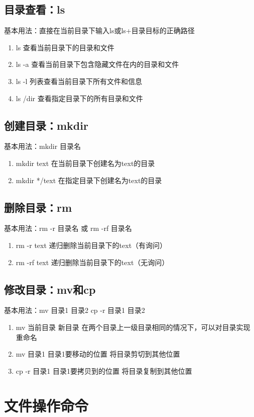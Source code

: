 \documentclass{article}
\begin{document}
\subsection{目录查看：ls}
基本用法：直接在当前目录下输入ls或ls+目录目标的正确路径
\begin{enumerate}
    \item ls 查看当前目录下的目录和文件
    \item ls -a 查看当前目录下包含隐藏文件在内的目录和文件
    \item ls -l 列表查看当前目录下所有文件和信息
    \item ls /dir 查看指定目录下的所有目录和文件
\end{enumerate}

\subsection{创建目录：mkdir}
基本用法：mkdir 目录名
\begin{enumerate}
    \item mkdir text 在当前目录下创建名为text的目录
    \item mkdir */text 在指定目录下创建名为text的目录
\end{enumerate}

\subsection{删除目录：rm}
基本用法：rm -r 目录名 或 rm -rf 目录名
\begin{enumerate}
    \item rm -r text 递归删除当前目录下的text（有询问）
    \item rm -rf text 递归删除当前目录下的text（无询问）
\end{enumerate}

\subsection{修改目录：mv和cp}
基本用法：mv 目录1 目录2 cp -r 目录1 目录2
\begin{enumerate}
    \item mv 当前目录 新目录 在两个目录上一级目录相同的情况下，可以对目录实现重命名
    \item mv 目录1 目录1要移动的位置 将目录剪切到其他位置
    \item cp -r 目录1 目录1要拷贝到的位置 将目录复制到其他位置
\end{enumerate}

\section{文件操作命令}
\end{document}
